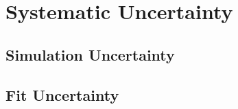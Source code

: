 

\section{Systematic Uncertainty}
\label{sec:Systematic}

\subsection{Simulation Uncertainty}
\label{ssec:Syst_SimUnc}

\subsection{Fit Uncertainty}
\label{ssec:Syst_FitUnc}


\FloatBarrier
